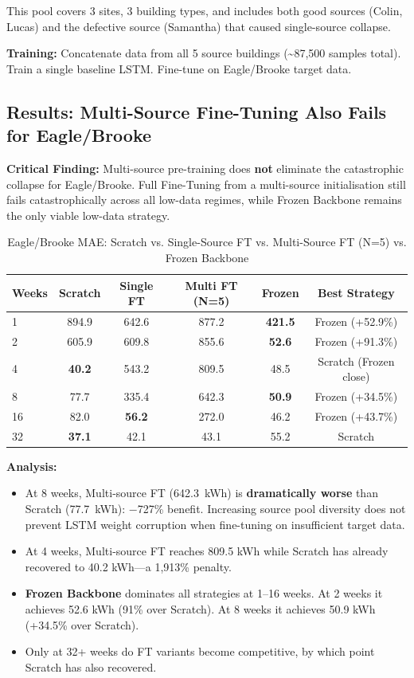 \documentclass[12pt,a4paper]{report}
\begin{document}
This pool covers 3 sites, 3 building types, and includes both good sources (Colin, Lucas) and the defective source (Samantha) that caused single-source collapse.

\textbf{Training:} Concatenate data from all 5 source buildings (\textasciitilde87,500 samples total). Train a single baseline LSTM. Fine-tune on Eagle/Brooke target data.

\subsection{Results: Multi-Source Fine-Tuning Also Fails for Eagle/Brooke}

\textbf{Critical Finding:} Multi-source pre-training does \textbf{not} eliminate the catastrophic collapse for Eagle/Brooke. Full Fine-Tuning from a multi-source initialisation still fails catastrophically across all low-data regimes, while Frozen Backbone remains the only viable low-data strategy.

\begin{table}[H]
\centering
\caption{Eagle/Brooke MAE: Scratch vs. Single-Source FT vs. Multi-Source FT (N=5) vs. Frozen Backbone}
\small
\begin{tabular}{lccccc}
\toprule
\textbf{Weeks} & \textbf{Scratch} & \textbf{Single FT} & \textbf{Multi FT (N=5)} & \textbf{Frozen} & \textbf{Best Strategy} \\
\midrule
1 & 894.9 & 642.6 & 877.2 & \textbf{421.5} & Frozen (+52.9\%) \\
2 & 605.9 & 609.8 & 855.6 & \textbf{52.6} & Frozen (+91.3\%) \\
4 & \textbf{40.2} & 543.2 & 809.5 & 48.5 & Scratch (Frozen close) \\
8 & 77.7 & 335.4 & 642.3 & \textbf{50.9} & Frozen (+34.5\%) \\
16 & 82.0 & \textbf{56.2} & 272.0 & 46.2 & Frozen (+43.7\%) \\
32 & \textbf{37.1} & 42.1 & 43.1 & 55.2 & Scratch \\
\bottomrule
\end{tabular}
\end{table}

\textbf{Analysis:}

\begin{itemize}
    \item At 8 weeks, Multi-source FT (642.3~kWh) is \textbf{dramatically worse} than Scratch (77.7~kWh): $-$727\% benefit. Increasing source pool diversity does not prevent LSTM weight corruption when fine-tuning on insufficient target data.
    \item At 4 weeks, Multi-source FT reaches 809.5 kWh while Scratch has already recovered to 40.2 kWh---a 1,913\% penalty.
    \item \textbf{Frozen Backbone} dominates all strategies at 1--16 weeks. At 2 weeks it achieves 52.6 kWh (91\% over Scratch). At 8 weeks it achieves 50.9 kWh (+34.5\% over Scratch).
    \item Only at 32+ weeks do FT variants become competitive, by which point Scratch has also recovered.
\end{itemize}
\end{document}
